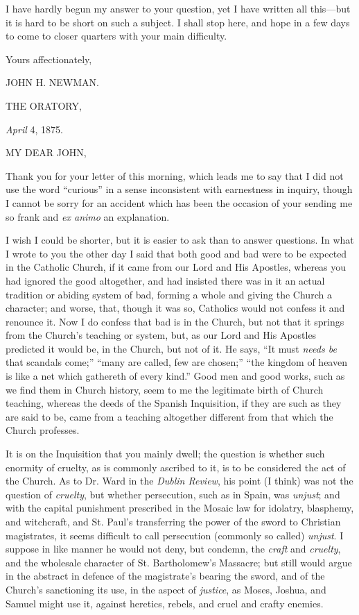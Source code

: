 I have hardly begun my answer to your question,
yet I have written all this—but it is hard to be short on such a
subject. I shall stop here, and hope in a few days to come to closer
quarters with your main difficulty.

Yours affectionately,

JOHN H. NEWMAN.

THE ORATORY,

\emph{April} 4, 1875.

MY DEAR
JOHN,

Thank you for your letter of this morning, which leads me to say that
I did not use the word ``curious'' in a sense inconsistent with
earnestness in inquiry, though I cannot be sorry for an accident which
has been the occasion of your sending me so frank and \emph{ex animo}
an explanation.

I wish I could be shorter, but it is easier to
ask than to answer questions. In what I wrote to you the other day I
said that both good and bad were to be expected in the Catholic
Church, if it came from our Lord and His Apostles, whereas you
had ignored the good altogether, and had insisted there was in it an
actual tradition or abiding system of bad, forming a whole and giving
the Church a character; and worse, that, though it was so, Catholics
would not confess it and renounce it. Now I do confess that bad is in
the Church, but not that it springs from the Church's teaching or
system, but, as our Lord and His Apostles predicted it would be, in
the Church, but not of it. He says, ``It must \emph{needs be} that
scandals come;'' ``many are called, few are chosen;'' ``the kingdom of
heaven is like a net which gathereth of every kind.'' Good men and good
works, such as we find them in Church history, seem to me the
legitimate birth of Church teaching, whereas the deeds of the Spanish
Inquisition, if they are such as they are said to be, came from a
teaching altogether different from that which the Church professes.

It is on the Inquisition that you mainly dwell;
the question is whether such enormity of cruelty, as is commonly
ascribed to it, is to be considered the act of the Church. As to Dr.
Ward in the \emph{Dublin Review}, his point (I think) was not the
question of \emph{cruelty}, but whether persecution, such as in Spain,
was \emph{unjust}; and with the capital punishment prescribed in the
Mosaic law for idolatry, blasphemy, and witchcraft, and St. Paul's
transferring the power of the sword to Christian magistrates, it seems
difficult to call persecution (commonly so called) \emph{unjust}. I
suppose in like manner he would not deny, but condemn, the \emph{craft}
and \emph{cruelty}, and the wholesale character of St. Bartholomew's
Massacre; but still would argue in the abstract in defence of the
magistrate's bearing the sword, and of the Church's sanctioning its
use, in the aspect of \emph{justice}, as Moses, Joshua, and Samuel
might use it, against heretics, rebels, and cruel and crafty enemies.

